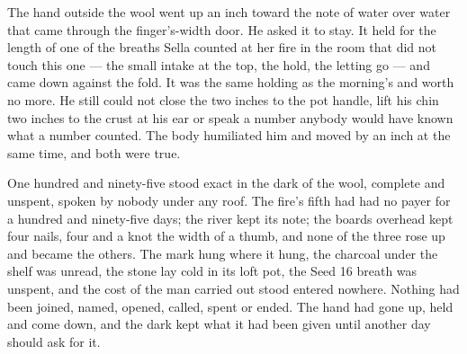 The hand outside the wool went up an inch toward the note of water over water that came through the finger's-width door. He asked it to stay. It held for the length of one of the breaths Sella counted at her fire in the room that did not touch this one --- the small intake at the top, the hold, the letting go --- and came down against the fold. It was the same holding as the morning's and worth no more. He still could not close the two inches to the pot handle, lift his chin two inches to the crust at his ear or speak a number anybody would have known what a number counted. The body humiliated him and moved by an inch at the same time, and both were true.

One hundred and ninety-five stood exact in the dark of the wool, complete and unspent, spoken by nobody under any roof. The fire's fifth had had no payer for a hundred and ninety-five days; the river kept its note; the boards overhead kept four nails, four and a knot the width of a thumb, and none of the three rose up and became the others. The mark hung where it hung, the charcoal under the shelf was unread, the stone lay cold in its loft pot, the Seed 16 breath was unspent, and the cost of the man carried out stood entered nowhere. Nothing had been joined, named, opened, called, spent or ended. The hand had gone up, held and come down, and the dark kept what it had been given until another day should ask for it.
